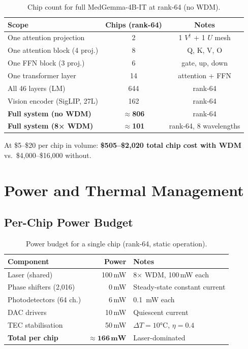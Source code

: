 \documentclass[12pt, a4paper]{article}
\begin{document}
\begin{table}[H]
\centering
\caption{Chip count for full MedGemma-4B-IT at rank-64 (no WDM).}
\label{tab:full_chip_count}
\begin{tabular}{lcc}
\toprule
\textbf{Scope} & \textbf{Chips (rank-64)} & \textbf{Notes} \\
\midrule
One attention projection       &  2 & 1 $V^\dagger$ + 1 $U$ mesh \\
One attention block (4 proj.)  &  8 & Q, K, V, O \\
One FFN block (3 proj.)        &  6 & gate, up, down \\
One transformer layer          & 14 & attention + FFN \\
All 46 layers (LM)             & 644 & rank-64 \\
Vision encoder (SigLIP, 27L)   & 162 & rank-64 \\
\midrule
\textbf{Full system (no WDM)} & \textbf{$\approx$806} & rank-64 \\
\textbf{Full system (8× WDM)} & \textbf{$\approx$101} & rank-64, 8 wavelengths \\
\bottomrule
\end{tabular}
\end{table}

At \$5–\$20 per chip in volume:
\textbf{\$505–\$2,020 total chip cost with WDM} vs.\ \$4,000–\$16,000 without.

\section{Power and Thermal Management}
\label{sec:power}

\subsection{Per-Chip Power Budget}

\begin{table}[H]
\centering
\caption{Power budget for a single chip (rank-64, static operation).}
\label{tab:chip_power}
\begin{tabular}{lrl}
\toprule
\textbf{Component} & \textbf{Power} & \textbf{Notes} \\
\midrule
Laser (shared)             &  100\,mW & 8× WDM, 100\,mW each \\
Phase shifters (2,016)     &    0\,mW & Steady-state constant current \\
Photodetectors (64 ch.)    &    6\,mW & \SI{0.1}{\milli\watt} each \\
DAC drivers                &   10\,mW & Quiescent current \\
TEC stabilisation          &   50\,mW & $\Delta T = 10$°C, $\eta = 0.4$ \\
\midrule
\textbf{Total per chip}    & $\approx\mathbf{166\,mW}$ & Laser-dominated \\
\bottomrule
\end{tabular}
\end{table}
\end{document}
